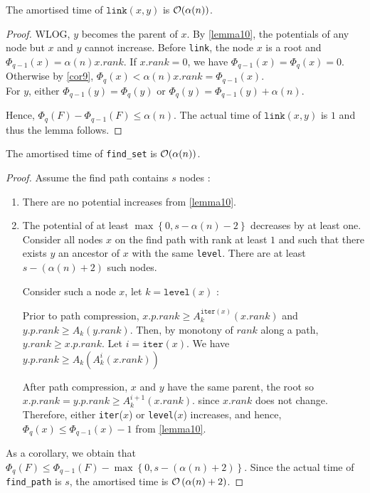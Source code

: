 \documentclass{cours}
\begin{document}
\begin{lemma}
    The amortised time of $\texttt{link}(x, y)$ is $\mathcal{O}(\alpha(n))$.
\end{lemma}
\begin{proof}
    WLOG, $y$ becomes the parent of $x$. By \ref{lemma10}, the potentials of any node but $x$ and $y$ cannot increase. Before \texttt{link}, the node $x$ is a root and $\Phi_{q - 1}(x) = \alpha(n)x.rank$. If $x.rank = 0$, we have $\Phi_{q - 1}(x) = \Phi_{q}(x) = 0$. Otherwise by \ref{cor9}, $\Phi_{q}(x) < \alpha(n)x.rank = \Phi_{q - 1}(x)$.\\
    For $y$, either $\Phi_{q - 1}(y) = \Phi_{q}(y)$ or $\Phi_{q}(y) = \Phi_{q - 1}(y) + \alpha(n)$.

    Hence, $\Phi_{q}(F) - \Phi_{q - 1}(F) \leq \alpha(n)$. The actual time of $\texttt{link}(x, y)$ is $1$ and thus the lemma follows. 
\end{proof}

\begin{lemma}
    The amortised time of \texttt{find_set} is $\mathcal{O}(\alpha(n))$.
\end{lemma}
\begin{proof}
    Assume the find path contains $s$ nodes : 
    \begin{enumerate}
        \item There are no potential increases from \ref{lemma10}.
        \item The potential of at least $\max \left\{0, s - \alpha(n) - 2\right\}$ decreases by at least one.
        Consider all nodes $x$ on the find path with rank at least $1$ and such that there exists $y$ an ancestor of $x$ with the same \texttt{level}. There are at least $s - \left(\alpha(n) + 2\right)$ such nodes. 

        Consider such a node $x$, let $k = \texttt{level}(x)$ : 
        
        Prior to path compression, $x.p.rank \geq A_{k}^{\texttt{iter}(x)}(x.rank)$ and $y.p.rank \geq A_{k}(y.rank)$. Then, by monotony of $rank$ along a path, $y.rank \geq x.p.rank$. Let $i = \texttt{iter}(x)$. We have $y.p.rank \geq A_{k}\left(A_{k}^{i}(x.rank)\right)$

        After path compression, $x$ and $y$ have the same parent, the root so $x.p.rank = y.p.rank \geq A_{k}^{i + 1}(x.rank)$. since $x.rank$ does not change. Therefore, either \texttt{iter}($x$) or \texttt{level}($x$) increases, and hence, $\Phi_{q}(x) \leq \Phi_{q - 1}(x) - 1$ from \ref{lemma10}.
    \end{enumerate}
    As a corollary, we obtain that $\Phi_{q}(F) \leq \Phi_{q - 1}(F) - \max \left\{0, s - \left(\alpha(n) + 2\right)\right\}$. Since the actual time of \texttt{find_path} is $s$, the amortised time is $\mathcal{O}\left(\alpha(n) + 2\right)$.
\end{proof}
\end{document}

